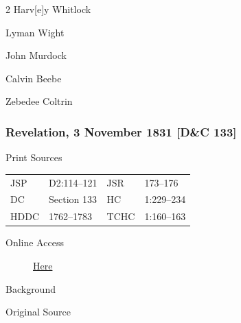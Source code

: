 {\begin{multicols}{2}
					Harv[e]y Whitlock
					
					Lyman Wight
					
					John Murdock
					
					Calvin Beebe
					
					Zebedee Coltrin
				\end{multicols}
				
		\subsubsection{Revelation, 3 November 1831 [D\&C 133]}
			\label{EMS-1831-JS-3-NOV-1831}
		
			\begin{description}
				\item[Print Sources]
			\end{description}

				\begin{tabular}{p{0.5in}p{1in}p{0.5in}p{1in}}
				JSP	 	& D2:114--121	& JSR 		& 173--176 \\
				DC	 	& Section 133 	& HC 		& 1:229--234 \\
				HDDC 	& 1762--1783	& TCHC 		& 1:160--163 \\
				\end{tabular}
			
			\begin{description}
				\item[Online Access] \href{https://www.josephsmithpapers.org/paper-summary/revelation-3-november-1831-dc-133/1}{Here}
			\end{description}
			
			\begin{description}
				\item[Background]
			\end{description}
			
			
			\begin{description}
				\item[Original Source]
			\end{description}
			
}
